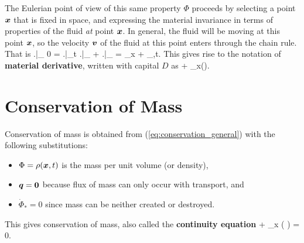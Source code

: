 \documentclass[10pt,reqno]{amsart}
\begin{document}
The Eulerian point of view of this same property $\Phi$ proceeds by 
selecting a point $\mbox{\boldmath $x$}$ that is fixed in space, and expressing the 
material invariance in terms of properties of the fluid {\em at} point $\mbox{\boldmath $x$}$. 
In general, the fluid will be moving at this point $\mbox{\boldmath $x$}$, so the velocity
$\mbox{\boldmath $v$}$ of the fluid at this point enters through the chain rule.  
That is
\be 
 \left.\right|_{\vX}
 \overset{(\ref{eq:material_invariance})}{=} 0
 = \left.\right|_{t}
   \left.\right|_{\vX} + 
   \left.\right|_{\vvarphi} 
 = \nabla_x \Phi \cdot \vv + \Phi_{,t}.
\ee
This gives rise to the notation of {\bf material derivative}, written with 
capital $D$ as
\be
   {} + \vv \cdot
  \nabla_x(\bullet).
\ee





\section{Conservation of Mass}
Conservation of mass is obtained from (\ref{eq:conservation_general}) 
with the following substitutions:
\begin{itemize}
 \item $\Phi = \rho(\mbox{\boldmath $x$}, t)$ is the mass per unit volume (or density),
 \item $\mbox{\boldmath $q$} = \mbox{\boldmath $0$}$ because flux of mass can only occur with transport, and 
 \item $\dot{\Phi}_* = 0$ since mass can be neither created or destroyed.
\end{itemize}
This gives conservation of mass, also called the {\bf continuity equation}
\be
  + \nabla_x \cdot \left( \rho \vv \right) = 0.
\ee

 




\end{document}
